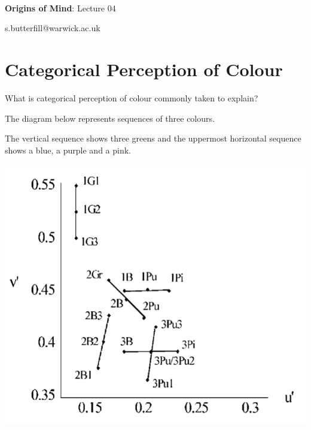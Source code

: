 \documentclass[12pt]{extarticle}
\date{}
\makeatletter
\def \ititle {Origins of Mind}
\def \isubtitle {Lecture 02}
\def \iemail{s.butterfill@warwick.ac.uk}
\makeatother
\begin{document}
\begin{multicols}{3}

\setlength\footnotesep{1em}









\def \ititle {Origins of Mind}

\def \isubtitle {Lecture 04}



\



\begin{center}

{\Large

\textbf{\ititle}: \isubtitle

}



\iemail %

\end{center}



\section{Categorical Perception of Colour}

What is categorical perception of colour commonly taken to explain?


The diagram below represents sequences of three colours.


The vertical sequence shows three greens and the uppermost horizontal sequence shows a blue, a purple and a pink.


\begin{center}


\includegraphics[scale=0.3]{daoutis_2006_fig_A1.png}



\end{center}
\end{multicols}
\end{document}
